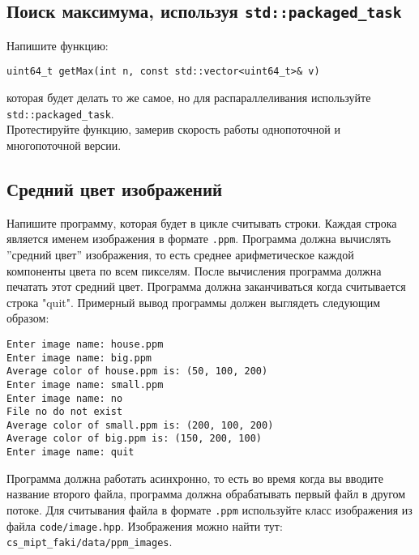 \documentclass{article}
\begin{document}
\subsection{Поиск максимума, используя \texttt{std::packaged\_task}}
Напишите функцию:
\begin{lstlisting}
uint64_t getMax(int n, const std::vector<uint64_t>& v)
\end{lstlisting}
которая будет делать то же самое, но для распараллеливания используйте \texttt{std::packaged\_task}.\\
Протестируйте функцию, замерив скорость работы однопоточной и многопоточной версии.



\subsection{Средний цвет изображений}
Напишите программу, которая будет в цикле считывать строки. Каждая строка является именем изображения в формате \texttt{.ppm}.
Программа должна вычислять ''средний цвет'' изображения, то есть среднее арифметическое каждой компоненты цвета по всем пикселям.
После вычисления программа должна печатать этот средний цвет. Программа должна заканчиваться когда считывается строка "quit".
Примерный вывод программы должен выглядеть следующим образом:
\begin{verbatim}
Enter image name: house.ppm
Enter image name: big.ppm
Average color of house.ppm is: (50, 100, 200)
Enter image name: small.ppm
Enter image name: no
File no do not exist
Average color of small.ppm is: (200, 100, 200)
Average color of big.ppm is: (150, 200, 100)
Enter image name: quit
\end{verbatim}

Программа должна работать асинхронно, то есть во время когда вы вводите название второго файла, программа должна обрабатывать первый файл в другом потоке. Для считывания файла в формате \texttt{.ppm} используйте класс изображения из файла \texttt{code/image.hpp}. Изображения можно найти тут: \texttt{cs\_mipt\_faki/data/ppm\_images}.
\end{document}
